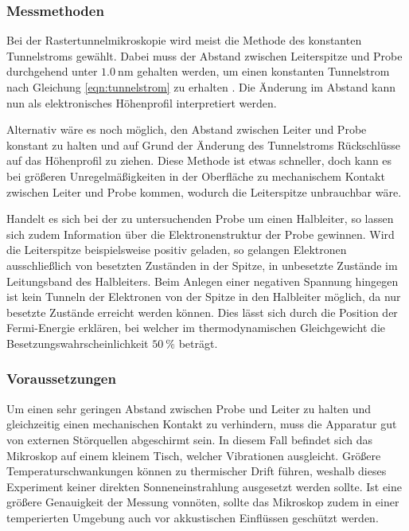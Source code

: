\subsubsection{Messmethoden} %
\label{ssub:messmethoden}

Bei der Rastertunnelmikroskopie wird meist die Methode des konstanten Tunnelstroms gewählt.
Dabei muss der Abstand zwischen Leiterspitze und Probe durchgehend unter $\SI{1,0}{\nano\meter}$ gehalten werden, um einen konstanten Tunnelstrom nach Gleichung \ref{eqn:tunnelstrom} zu erhalten \cite{STM-Handbuch}.
Die Änderung im Abstand kann nun als elektronisches Höhenprofil interpretiert werden.

Alternativ wäre es noch möglich, den Abstand zwischen Leiter und Probe konstant zu halten und auf Grund der Änderung des Tunnelstroms Rückschlüsse auf das Höhenprofil zu ziehen.
Diese Methode ist etwas schneller, doch kann es bei größeren Unregelmäßigkeiten in der Oberfläche zu mechanischem Kontakt zwischen Leiter und Probe kommen, wodurch die Leiterspitze unbrauchbar wäre.

Handelt es sich bei der zu untersuchenden Probe um einen Halbleiter, so lassen sich zudem Information über die Elektronenstruktur der Probe gewinnen.
Wird die Leiterspitze beispielsweise positiv geladen, so gelangen Elektronen ausschließlich von besetzten Zuständen in der Spitze, in unbesetzte Zustände im Leitungsband des Halbleiters.
Beim Anlegen einer negativen Spannung hingegen ist kein Tunneln der Elektronen von der Spitze in den Halbleiter möglich, da nur besetzte Zustände erreicht werden können.
Dies lässt sich durch die Position der Fermi-Energie erklären, bei welcher im thermodynamischen Gleichgewicht die Besetzungswahrscheinlichkeit $\SI{50}{\percent}$ beträgt.

\subsubsection{Voraussetzungen} %
\label{ssub:voraussetzungen}

Um einen sehr geringen Abstand zwischen Probe und Leiter zu halten und gleichzeitig einen mechanischen Kontakt zu verhindern, muss die Apparatur gut von externen Störquellen abgeschirmt sein.
In diesem Fall befindet sich das Mikroskop auf einem kleinem Tisch, welcher Vibrationen ausgleicht.
Größere Temperaturschwankungen können zu thermischer Drift führen, weshalb dieses Experiment keiner direkten Sonneneinstrahlung ausgesetzt werden sollte.
Ist eine größere Genauigkeit der Messung vonnöten, sollte das Mikroskop zudem in einer temperierten Umgebung auch vor akkustischen Einflüssen geschützt werden.

